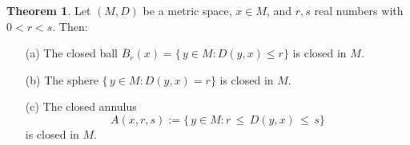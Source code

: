 \documentclass[12pt]{article}
\theoremstyle{definition} %
\newtheorem{theorem}{Theorem}
\theoremstyle{plain} %
\begin{document}
                    \begin{theorem}
                        Let $(M,D)$ be a metric space, $x \in M$, and $r,s$ real numbers with $0 < r < s$. Then:
                        \begin{itemize}
                        \item[(a)] The closed ball $\overline{B}_r(x) = \{\,y \in M : D(y,x) \le r\}$ is closed in $M$.
                        \item[(b)] The sphere $\{\,y \in M : D(y,x) = r\}$ is closed in $M$.
                        \item[(c)] The closed annulus
                        \[
                        A(x,r,s) := \{\,y \in M : r \,\le\, D(y,x) \,\le\, s\}
                        \]
                        is closed in $M$.
                        \end{itemize}
                        \end{theorem}
                        
\end{document}
